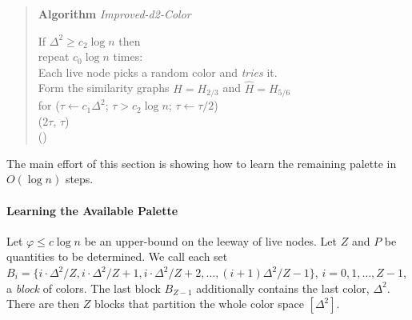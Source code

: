 \begin{quote}
   \textbf{Algorithm} \emph{Improved-d2-Color}

   If $\Delta^2 \ge c_2\log n$ then  \\
   \hspace*{2em} repeat $c_0 \log n$ times: \\
   \hspace*{4em} Each live node picks a random color and \emph{tries} it. \\     
   \hspace*{2em} Form the similarity graphs $H=H_{2/3}$ and $\hat{H} = H_{5/6}$ \\
   \hspace*{2em} for ($\tau \leftarrow c_1 \Delta^2$; $\tau > c_2\log n$; $\tau \leftarrow \tau/2$) \\
   \hspace*{4em}      ($2 \tau$, $\tau$) \\
    () \\
\end{quote}

The main effort of this section is showing how to learn the remaining palette in $O(\log n)$ steps.

\paragraph{Learning the Available Palette}
%
Let $\varphi \le c\log n$ be an upper-bound on the leeway of live nodes.
Let $Z$ and $P$ be quantities to be determined.
We call each set $B_i = \{i\cdot \Delta^2/Z, i\cdot \Delta^2/Z+1, i\cdot \Delta^2/Z+2, \ldots, (i+1)\Delta^2/Z-1 \}$, $i=0,1,\ldots, Z-1$, a \emph{block} of colors. The last block $B_{Z-1}$ additionally contains the last color, $\Delta^2$. 
There are then $Z$ blocks %
that partition the whole color space $[\Delta^2]$.

